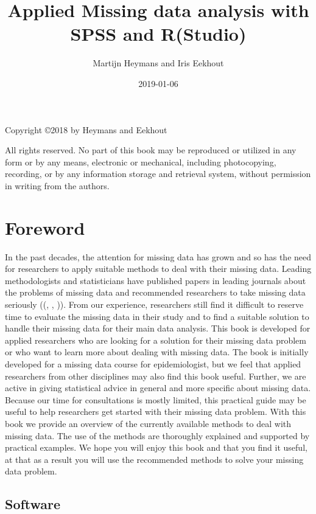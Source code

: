 \documentclass[]{book}
\title{Applied Missing data analysis with SPSS and R(Studio)}
\author{Martijn Heymans and Iris Eekhout}
\date{2019-01-06}
\begin{document}
\maketitle

{
\setcounter{tocdepth}{1}
\tableofcontents
}
Copyright ©2018 by Heymans and Eekhout

All rights reserved. No part of this book may be reproduced or utilized
in any form or by any means, electronic or mechanical, including
photocopying, recording, or by any information storage and retrieval
system, without permission in writing from the authors.

\chapter*{Foreword}\label{foreword}

In the past decades, the attention for missing data has grown and so has
the need for researchers to apply suitable methods to deal with their
missing data. Leading methodologists and statisticians have published
papers in leading journals about the problems of missing data and
recommended researchers to take missing data seriously
((\citet{sterne2009multiple}, \citet{little2012prevention},
\citet{Li2015})). From our experience, researchers still find it
difficult to reserve time to evaluate the missing data in their study
and to find a suitable solution to handle their missing data for their
main data analysis. This book is developed for applied researchers who
are looking for a solution for their missing data problem or who want to
learn more about dealing with missing data. The book is initially
developed for a missing data course for epidemiologist, but we feel that
applied researchers from other disciplines may also find this book
useful. Further, we are active in giving statistical advice in general
and more specific about missing data. Because our time for consultations
is mostly limited, this practical guide may be useful to help
researchers get started with their missing data problem. With this book
we provide an overview of the currently available methods to deal with
missing data. The use of the methods are thoroughly explained and
supported by practical examples. We hope you will enjoy this book and
that you find it useful, at that as a result you will use the
recommended methods to solve your missing data problem.

\section{Software}\label{software}
\end{document}
